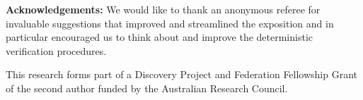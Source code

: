 \bigskip\noindent
{\bf Acknowledgements:}\quad 
We would like to thank an anonymous referee for invaluable
suggestions that improved and streamlined the exposition and in particular encouraged us to think about and improve
the deterministic verification procedures.

This research forms part of a Discovery
Project and Federation Fellowship Grant of the  second author funded by the
Australian Research Council.%

%
%

%

